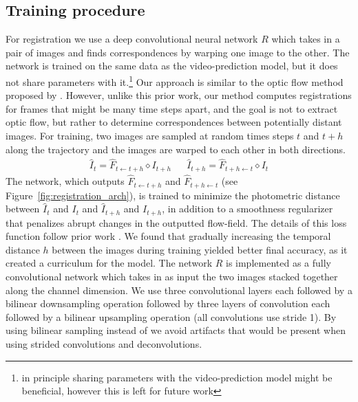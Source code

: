 
\subsection{Training procedure}

For registration we use a deep convolutional neural network $R$ which takes in a pair of images and finds correspondences by warping one image to the other. The network is trained on the same data as the video-prediction model, but it does not share parameters with it.\footnote{in principle sharing parameters with the video-prediction model might be beneficial, however this is left for future work} Our approach is similar to the optic flow method proposed by \citet{meister2017unflow}. However, unlike this prior work, our method computes registrations for frames that might be many time steps apart, and the goal is not to extract optic flow, but rather to determine correspondences between potentially distant images. For training, two images are sampled at random times steps $t$ and $t+h$ along the trajectory and the images are warped to each other in both directions. 
\begin{align}
     \hat{I}_{t} = \hat{F}_{t \leftarrow t +h} \diamond  I_{t+h} &&
     \hat{I}_{t+h} = \hat{F}_{t+h \leftarrow t} \diamond  I_{t}
\end{align}
The network, which outputs $\hat{F}_{t \leftarrow t +h}$ and $\hat{F}_{t+h \leftarrow t}$ (see Figure~\ref{fig:registration_arch}), is trained to minimize the photometric distance between $\hat{I}_t$ and $I_t$ and $\hat{I}_{t+h}$ and $I_{t+h}$, in addition to a smoothness regularizer that penalizes abrupt changes in the outputted flow-field. The details of this loss function follow prior work \cite{meister2017unflow}. We found that gradually increasing the temporal distance $h$ between the images during training yielded better final accuracy, as it created a curriculum for the model.
The network $R$ is implemented as a fully convolutional network which takes in as input the two images stacked together along the channel dimension. We use three convolutional layers each followed by a bilinear downsampling operation followed by three layers of convolution each followed by a bilinear upsampling operation (all convolutions use stride 1). By using bilinear sampling instead of we avoid artifacts that would be present when using strided convolutions and deconvolutions.
